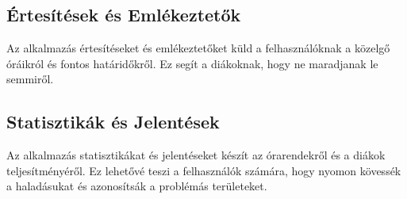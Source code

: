 \documentclass{article}
\begin{document}
\subsection{Értesítések és Emlékeztetők}
Az alkalmazás értesítéseket és emlékeztetőket küld a felhasználóknak a közelgő óráikról és fontos határidőkről. Ez segít a diákoknak, hogy ne maradjanak le semmiről.

\subsection{Statisztikák és Jelentések}
Az alkalmazás statisztikákat és jelentéseket készít az órarendekről és a diákok teljesítményéről. Ez lehetővé teszi a felhasználók számára, hogy nyomon kövessék a haladásukat és azonosítsák a problémás területeket.
\end{document}
